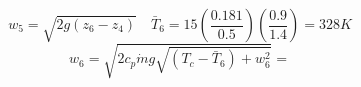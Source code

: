 

\item[(b)] 
    \[
    w_5 = \sqrt{2g(z_6 - z_4)} \quad \bar{T}_6 = 15 \left( \frac{0.181}{0.5} \right) \left( \frac{0.9}{1.4} \right) = 328 K
    \]
    \[
    w_6 = \sqrt{2 c_p \dot{m} g \sqrt{(T_c - \bar{T}_6) + w_6^2}} = 
    \]